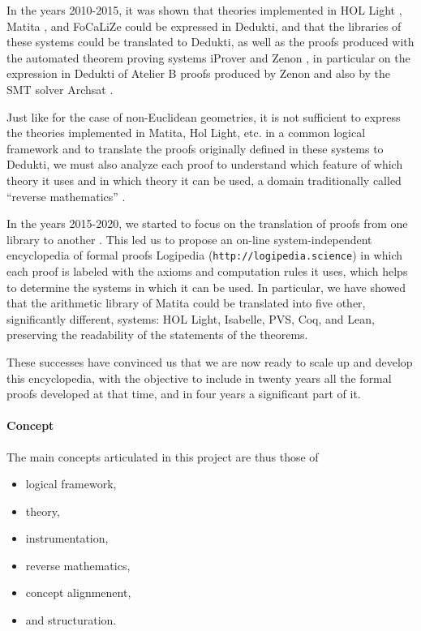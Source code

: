 In the years 2010-2015, it was shown that theories implemented in {\sc
HOL Light} \cite{Assaf12}, {\sc Matita} \cite{Assaf15}, and {\sc
FoCaLiZe} \cite{Cauderlier16} could be expressed in {\sc Dedukti},
and that the libraries of these systems could be translated to {\sc
Dedukti}, as well as the proofs produced with the automated theorem
proving systems {\sc iProver} \cite{Burel10} and {\sc Zenon}
\cite{CauderlierHalmagrand15}, in particular on the expression in {\sc
  Dedukti} of {\sc Atelier B} proofs produced by {\sc Zenon} and also
by the SMT solver {\sc Archsat} \cite{Bury19}.

Just like for the case of non-Euclidean geometries, it is not
sufficient to express the theories implemented in {\sc Matita}, {\sc
  Hol Light}, etc.  in a common logical framework and to translate the
proofs originally defined in these systems to {\sc Dedukti}, we must
also analyze each proof to understand which feature of which theory it
uses and in which theory it can be used, a domain traditionally called
“reverse mathematics” \cite{Friedman76,Simpson09,Dowek17}.


In the years 2015-2020, we started to focus on the translation of
proofs from one library to another \cite{Dowek17,Thire18}. This led us
to propose an on-line system-independent encyclopedia of formal proofs
{\sc Logipedia} ({\tt http://logipedia.science}) in which each proof
is labeled with the axioms and computation rules it uses, which helps
to determine the systems in which it can be used. In particular, we
have showed that the arithmetic library of {\sc Matita} could be
translated into five other, significantly different, systems: {\sc HOL
Light}, {\sc Isabelle}, {\sc PVS}, {\sc Coq}, and {\sc Lean},
preserving the readability of the statements of the theorems.

These successes have convinced us that we are now ready to scale up
and develop this encyclopedia, with the objective to include in twenty
years all the formal proofs developed at that time, and in four years a
significant part of it. 

\paragraph{Concept}

The main concepts articulated in this project are thus those of
\begin{itemize}
\item logical framework,
\item theory,
\item instrumentation,
\item reverse mathematics,
\item concept alignmenent,
\item and structuration.
\end{itemize}

